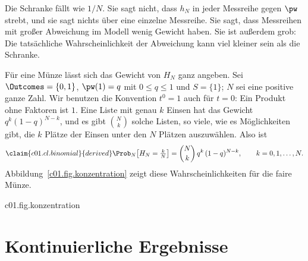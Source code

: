 \begin{vertiefung}
  Die Schranke fällt wie $1/N$. Sie sagt nicht, dass $h_N$ in jeder Messreihe gegen
  $\pw$ strebt, und sie sagt nichts über eine einzelne Messreihe. Sie sagt, dass
  Messreihen mit großer Abweichung im Modell wenig Gewicht haben. Sie ist außerdem grob:
  Die tatsächliche Wahrscheinlichkeit der Abweichung kann viel kleiner sein als die
  Schranke.

  Für eine Münze lässt sich das Gewicht von $H_N$ ganz angeben. Sei
  $\Outcomes = \{0, 1\}$, $\pw(1) = q$ mit $0 \leq q \leq 1$ und $S = \{1\}$; $N$ sei eine
  positive ganze Zahl. Wir benutzen die Konvention $t^0 = 1$ auch für $t = 0$: Ein
  Produkt ohne Faktoren ist $1$. Eine Liste mit genau $k$ Einsen hat
  das Gewicht $q^k (1-q)^{N-k}$, und es gibt $\binom{N}{k}$ solche Listen, so viele, wie
  es Möglichkeiten gibt, die $k$ Plätze der Einsen unter den $N$ Plätzen auszuwählen. Also
  ist
  \begin{equation}\label{c01.eq.binomial}\claim{c01.cl.binomial}{derived}
    \Prob_N\bigl[H_N = \tfrac{k}{N}\bigr] = \binom{N}{k}\, q^k\, (1-q)^{N-k},
    \qquad k = 0, 1, \dots, N .
  \end{equation}
  Abbildung~\ref{c01.fig.konzentration} zeigt diese Wahrscheinlichkeiten für die faire
  Münze.

  \begin{tpcfigure}{c01.fig.konzentration}

    \caption{Das Gewicht der relativen Häufigkeit $H_N$ von „Zahl“ bei einer fairen Münze,
      $q = \tfrac12$, nach Gleichung~\eqref{c01.eq.binomial} für $N = 4$, $16$ und $64$
      Würfe. Waagerecht steht der Wert $k/N$ von $H_N$; die Höhe eines Strichs ist seine
      Wahrscheinlichkeit, in jedem Bild in Einheiten des größten Werts. Die Klammer
      markiert die Werte mit $\abs{H_N - \tfrac12} < \tfrac14$. Mit wachsendem $N$
      sammelt sich das Gewicht in der Mitte.}
  \end{tpcfigure}
\end{vertiefung}

\section{Kontinuierliche Ergebnisse}\label{c01.s4}

